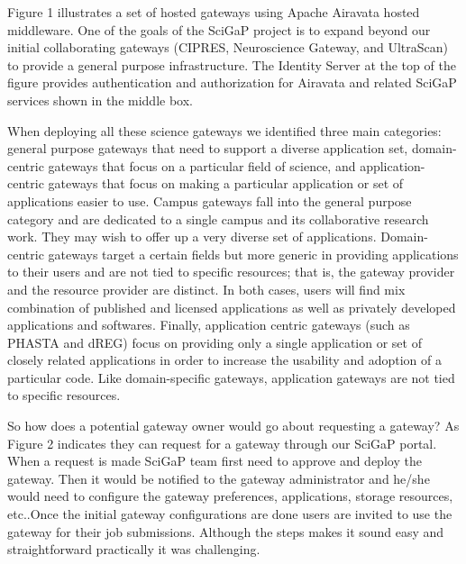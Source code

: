 \documentclass[sigconf]{acmart}
\begin{document}
Figure 1 illustrates a set of hosted gateways using Apache Airavata hosted middleware. One of the goals of the SciGaP project is to expand beyond our initial collaborating gateways (CIPRES, Neuroscience Gateway, and UltraScan) to provide a general purpose infrastructure.  The Identity Server \cite{nakandala2016apache} at the top of the figure provides authentication and authorization for Airavata and related SciGaP services shown in the middle box.

When deploying all these science gateways we identified three main categories:  general purpose gateways that need to support a diverse application set, domain-centric gateways that focus on a particular field of science, and application-centric gateways that focus on making a particular application or set of applications easier to use. Campus gateways fall into the general purpose category and are dedicated to a single campus and its collaborative research work. They may wish to offer up a very diverse set of applications.  Domain-centric gateways target a certain fields but more generic in providing applications to their users and are not tied to specific resources; that is, the gateway provider and the resource provider are distinct. In both cases, users will find mix combination of published and licensed applications as well as privately developed applications and softwares. Finally, application centric gateways (such as PHASTA and dREG) focus on providing only a single application or set of closely related applications in order to increase the usability and adoption of a particular code. Like domain-specific gateways, application gateways are not tied to specific resources.

So how does a potential gateway owner would go about requesting a gateway? As Figure 2 indicates they can request for a gateway through our SciGaP portal. When a request is made SciGaP team first need to approve and deploy the gateway. Then it would be notified to the gateway administrator  and he/she would need to configure the gateway preferences, applications, storage resources, etc..Once the initial gateway configurations are done users are invited to use the gateway for their job submissions. Although the steps makes it sound easy and straightforward practically it was challenging.
\end{document}
